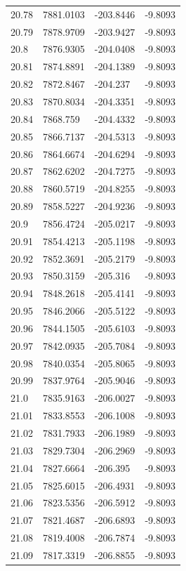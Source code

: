 \begin{table}[H]
\begin{tabular}{llll}
20.78 & 7881.0103 & -203.8446 & -9.8093 \\
20.79 & 7878.9709 & -203.9427 & -9.8093 \\
20.8 & 7876.9305 & -204.0408 & -9.8093 \\
20.81 & 7874.8891 & -204.1389 & -9.8093 \\
20.82 & 7872.8467 & -204.237 & -9.8093 \\
20.83 & 7870.8034 & -204.3351 & -9.8093 \\
20.84 & 7868.759 & -204.4332 & -9.8093 \\
20.85 & 7866.7137 & -204.5313 & -9.8093 \\
20.86 & 7864.6674 & -204.6294 & -9.8093 \\
20.87 & 7862.6202 & -204.7275 & -9.8093 \\
20.88 & 7860.5719 & -204.8255 & -9.8093 \\
20.89 & 7858.5227 & -204.9236 & -9.8093 \\
20.9 & 7856.4724 & -205.0217 & -9.8093 \\
20.91 & 7854.4213 & -205.1198 & -9.8093 \\
20.92 & 7852.3691 & -205.2179 & -9.8093 \\
20.93 & 7850.3159 & -205.316 & -9.8093 \\
20.94 & 7848.2618 & -205.4141 & -9.8093 \\
20.95 & 7846.2066 & -205.5122 & -9.8093 \\
20.96 & 7844.1505 & -205.6103 & -9.8093 \\
20.97 & 7842.0935 & -205.7084 & -9.8093 \\
20.98 & 7840.0354 & -205.8065 & -9.8093 \\
20.99 & 7837.9764 & -205.9046 & -9.8093 \\
21.0 & 7835.9163 & -206.0027 & -9.8093 \\
21.01 & 7833.8553 & -206.1008 & -9.8093 \\
21.02 & 7831.7933 & -206.1989 & -9.8093 \\
21.03 & 7829.7304 & -206.2969 & -9.8093 \\
21.04 & 7827.6664 & -206.395 & -9.8093 \\
21.05 & 7825.6015 & -206.4931 & -9.8093 \\
21.06 & 7823.5356 & -206.5912 & -9.8093 \\
21.07 & 7821.4687 & -206.6893 & -9.8093 \\
21.08 & 7819.4008 & -206.7874 & -9.8093 \\
21.09 & 7817.3319 & -206.8855 & -9.8093 \\

\end{tabular}
\end{table}
